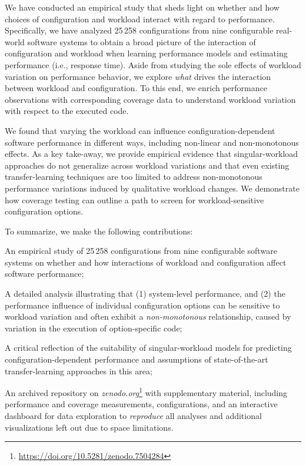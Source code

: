 We have conducted an empirical study that sheds light on whether and how choices of configuration and workload interact with regard to performance. 
Specifically, we have analyzed 25\,258 configurations from nine configurable real-world software systems to obtain a broad picture of the interaction of configuration and workload when learning performance models and estimating  performance (i.e., response time). Aside from studying the sole effects of workload variation on performance behavior, we explore \textit{what} drives the interaction between workload and configuration. To this end, we enrich performance observations with corresponding coverage data to understand workload variation with respect to the executed code.


{
	We found that varying the workload can influence configuration-dependent software performance in different ways, including non-linear and non-monotonous effects. As a key take-away, we provide empirical evidence that singular-workload approaches do not generalize across workload variations  and that even existing transfer-learning techniques are too limited to address non-monotonous performance variations induced by qualitative workload changes. 
We demonstrate how coverage testing can outline a path to screen for workload-sensitive configuration options.
}

To summarize, we make the following contributions: 
\begin{compactitem}
	\item An empirical study of 25\,258 configurations from nine configurable software systems on whether and how interactions of workload and configuration affect software performance;
	{\color{black}
		\item A detailed analysis illustrating that (1) system-level performance, and (2) the performance influence of individual configuration options can be sensitive to workload variation and often exhibit a \textit{non-monotonous} relationship, caused by variation in the execution of option-specific  code;
		
		\item A critical reflection of the suitability of singular-workload models for predicting configuration-dependent performance and assumptions of state-of-the-art transfer-learning approaches in this area;}
	
	\item {An archived repository on \textit{zenodo.org}\footnote{\url{https://doi.org/10.5281/zenodo.7504284}} with supplementary material, including performance and coverage measurements, configurations, and an interactive dashboard for data exploration to \textit{reproduce} all analyses and additional visualizations left out due to space limitations.}
\end{compactitem}

